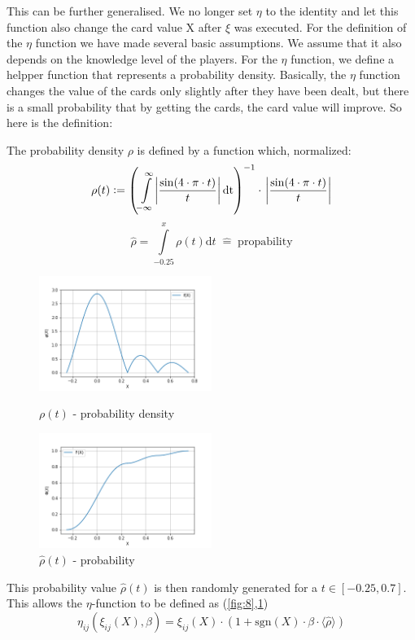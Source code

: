 This can be further generalised. We no longer set $\eta$ to the identity and let this function also change the card value X after $\xi$ was executed. For the definition of the $\eta$ function we have made several basic assumptions. We assume that it also depends on the knowledge level of the players. For the $\eta$ function, we define a helpper function that represents a probability density. Basically, the $\eta$ function changes the value of the cards only slightly after they have been dealt, but there is a small probability that by getting the cards, the card value will improve. So here is the definition:
\begin{definition}
The probability density $\rho$ is defined by a function which, normalized:
$$
\rho (t) := \left(\int\limits_{-\infty}^{\infty}\abs{\frac{\sin(4\cdot\pi\cdot t)}{t}}\mathrm{dt}\right)^{-1}\cdot\;\abs{\frac{\sin(4\cdot\pi\cdot t)}{t}}
$$
$$
\widehat{\rho} = \int\limits_{-0.25}^{x}\rho (t)\mathrm{d} t\;\widehat{=}\;\mathrm{propability}
$$
\end{definition}
\begin{figure}[h]
    \centering
    \includegraphics[width=0.5\textwidth]{Bilder/b1_e}
    \caption{$\rho(t)$ - probability density}
    \label{fig:8}
    \centering
    \includegraphics[width=0.5\textwidth]{Bilder/b1_f}
    \caption{$\widehat{\rho}(t)$ - probability}
    \label{fig:9}
\end{figure}
This probability value $\hat{\rho}(t)$ is then randomly generated for a $t\in [-0.25,0.7]$. This allows the $\eta$-function to be defined as (\ref{fig:8},\ref{fig:9})
\begin{equation*}
\eta_{ij}(\xi_{ij}(X),\beta) = \xi_{ij}(X)\cdot(1+\mathrm{sgn}(X)\cdot\beta\cdot\langle\widehat{\rho}\rangle)
\end{equation*}
